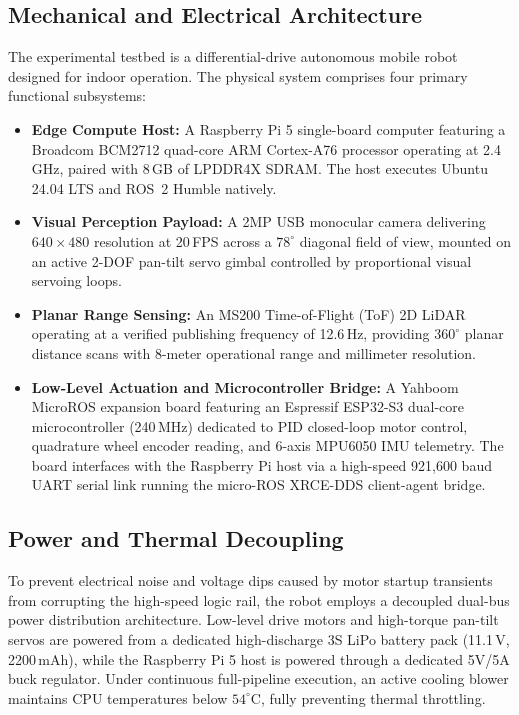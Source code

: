 \documentclass[journal]{IEEEtran}
\begin{document}
\subsection{Mechanical and Electrical Architecture}
The experimental testbed is a differential-drive autonomous mobile robot designed for indoor operation. The physical system comprises four primary functional subsystems:
\begin{itemize}
    \item \textbf{Edge Compute Host:} A Raspberry Pi 5 single-board computer featuring a Broadcom BCM2712 quad-core ARM Cortex-A76 processor operating at 2.4\,GHz, paired with 8\,GB of LPDDR4X SDRAM. The host executes Ubuntu 24.04 LTS and ROS~2 Humble natively.
    \item \textbf{Visual Perception Payload:} A 2MP USB monocular camera delivering $640 \times 480$ resolution at 20\,FPS across a $78^\circ$ diagonal field of view, mounted on an active 2-DOF pan-tilt servo gimbal controlled by proportional visual servoing loops.
    \item \textbf{Planar Range Sensing:} An MS200 Time-of-Flight (ToF) 2D LiDAR operating at a verified publishing frequency of 12.6\,Hz, providing $360^\circ$ planar distance scans with 8-meter operational range and millimeter resolution.
    \item \textbf{Low-Level Actuation and Microcontroller Bridge:} A Yahboom MicroROS expansion board featuring an Espressif ESP32-S3 dual-core microcontroller (240\,MHz) dedicated to PID closed-loop motor control, quadrature wheel encoder reading, and 6-axis MPU6050 IMU telemetry. The board interfaces with the Raspberry Pi host via a high-speed 921,600 baud UART serial link running the micro-ROS XRCE-DDS client-agent bridge.
\end{itemize}

\subsection{Power and Thermal Decoupling}
To prevent electrical noise and voltage dips caused by motor startup transients from corrupting the high-speed logic rail, the robot employs a decoupled dual-bus power distribution architecture. Low-level drive motors and high-torque pan-tilt servos are powered from a dedicated high-discharge 3S LiPo battery pack (11.1\,V, 2200\,mAh), while the Raspberry Pi 5 host is powered through a dedicated 5V/5A buck regulator. Under continuous full-pipeline execution, an active cooling blower maintains CPU temperatures below $54^\circ\text{C}$, fully preventing thermal throttling.
\end{document}
